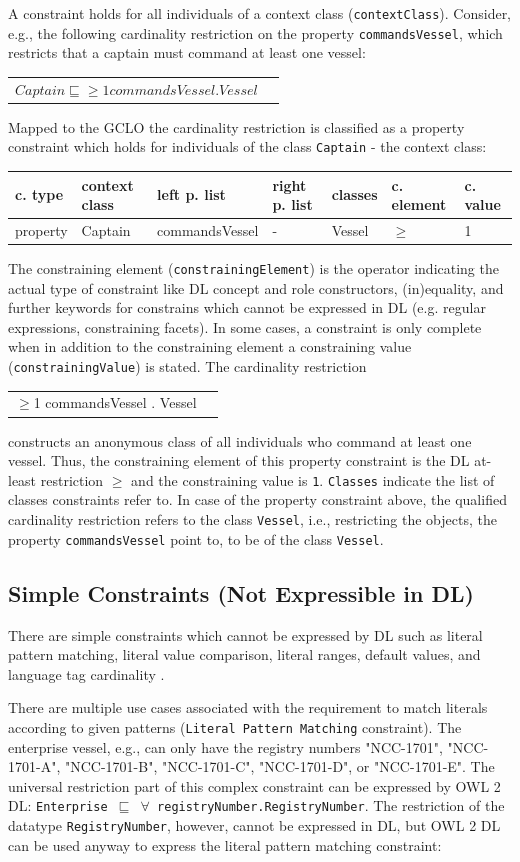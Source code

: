 \documentclass{llncs}
\newcommand{\ms}[1]{\texttt{#1}}
\newenvironment{gcotable}{
  \scriptsize
  \sffamily
  \vspace{0.3cm}
	\begin{center}
  \begin{tabular}{l|l|l|l|l|l|l}
  \hline
  \textbf{c. type} & \textbf{context class} & \textbf{left p. list} & \textbf{right p. list} & \textbf{classes} & \textbf{c. element} & \textbf{c. value} \\
  \hline

}{
  \hline
  \end{tabular}
	\end{center}
}
\newenvironment{DL}{
	\begin{center}
  \begin{tabular}{r l}

}{
  \end{tabular}
	\end{center}
}
\begin{document}
A constraint holds for all individuals of a context class (\ms{contextClass}).
Consider, e.g., the following cardinality restriction on the property \ms{commandsVessel}, which restricts that a captain must command at least one vessel: 
\begin{DL}
$Captain \sqsubseteq \geq1 commandsVessel . Vessel $
\end{DL}
Mapped to the GCLO the cardinality restriction is classified as a property constraint which holds for individuals of the class \ms{Captain} - the context class:
\begin{gcotable}
property & Captain & commandsVessel & - & Vessel & $\geq$ & 1 \\
\end{gcotable}
The constraining element (\ms{constrainingElement}) is the operator indicating the actual type of constraint like DL concept and role constructors, (in)equality, and further keywords for constrains which cannot be expressed in DL (e.g. regular expressions, constraining facets).
In some cases, a constraint is only complete when in addition to the constraining element a constraining value (\ms{constrainingValue}) is stated.
The cardinality restriction 
\begin{DL}
$\geq$1 commandsVessel . Vessel
\end{DL}
constructs an anonymous class of all individuals who command at least one vessel.
Thus, the constraining element of this property constraint is the DL at-least restriction \ms{$\geq$} and the constraining value is \ms{1}.
\ms{Classes} indicate the list of classes constraints refer to.
In case of the property constraint above, the qualified cardinality restriction refers to the class \ms{Vessel}, 
i.e., restricting the objects, the property \ms{commandsVessel} point to, to be of the class \ms{Vessel}.

\subsection{Simple Constraints (Not Expressible in DL)}

There are simple constraints which cannot be expressed by DL such as literal pattern matching, literal value comparison, literal ranges, default values, and language tag cardinality \cite{BoschNolleAcarEckert2015}.


There are multiple use cases associated with the requirement to match literals according to given patterns (\ms{Literal Pattern Matching} constraint).
The enterprise vessel, e.g.,  can only have the registry numbers "NCC-1701", "NCC-1701-A", "NCC-1701-B", "NCC-1701-C", "NCC-1701-D", or "NCC-1701-E".
The universal restriction part of this complex constraint can be expressed by OWL 2 DL:
\ms{Enterprise $\sqsubseteq$ $\forall$ registryNumber.RegistryNumber}.
The restriction of the datatype \ms{RegistryNumber}, however, cannot be expressed in DL, but OWL 2 DL can be used anyway to express the literal pattern matching constraint:
\end{document}
